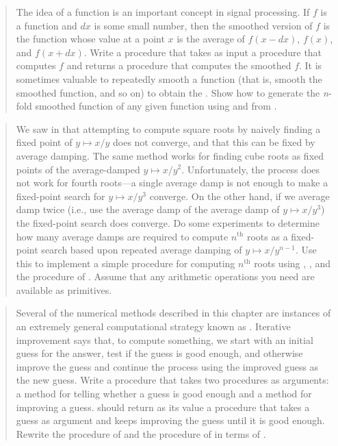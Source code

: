 \begin{quote}
 The idea of  a
function is an important concept in signal processing.  If \( f \) is a function
and \( dx \) is some small number, then the smoothed version of \( f \) is the
function whose value at a point \( x \) is the average of \( f(x - dx) \),
\( f(x) \), and \( f(x + dx) \).  Write a procedure
 that takes as input a procedure that computes \( f \) and returns a
procedure that computes the smoothed \( f \).  It is sometimes valuable to
repeatedly smooth a function (that is, smooth the smoothed function, and so on)
to obtain the .  Show how to generate
the \textit{n}-fold smoothed function of any given function using  and
 from .
\end{quote}

\begin{quote}
 We saw in 
that attempting to compute square roots by naively finding a fixed point of
\( y \mapsto x / y \) does not converge, and that this can be fixed by average
damping.  The same method works for finding cube roots as fixed points of the
average-damped \( y \mapsto x / y^2 \).  Unfortunately, the process does not
work for fourth roots---a single average damp is not enough to make a
fixed-point search for \( y \mapsto x / y^3 \) converge.  On the other hand, if
we average damp twice (i.e., use the average damp of the average damp of
\( y \mapsto x / y^3 \)) the fixed-point search does converge.  Do some experiments
to determine how many average damps are required to compute \( n^{\mathrm{th}} \) roots as a
fixed-point search based upon repeated average damping of \( y \mapsto x / y^{n-1} \).
Use this to implement a simple procedure for computing
\( n^{\mathrm{th}} \) roots using , , and the
 procedure of .  Assume that any arithmetic
operations you need are available as primitives.
\end{quote}

\begin{quote}
 Several of the numerical methods
described in this chapter are instances of an extremely general computational
strategy known as .  Iterative improvement says
that, to compute something, we start with an initial guess for the answer, test
if the guess is good enough, and otherwise improve the guess and continue the
process using the improved guess as the new guess.  Write a procedure
 that takes two procedures as arguments: a method for
telling whether a guess is good enough and a method for improving a guess.
 should return as its value a procedure that takes a
guess as argument and keeps improving the guess until it is good enough.
Rewrite the  procedure of  and the
 procedure of  in terms of
.
\end{quote}
